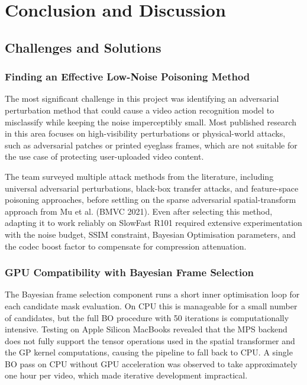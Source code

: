 \chapter{Conclusion and Discussion}
\label{chap:conclusion-discussion}

\section{Challenges and Solutions}
\label{section:challenges}

\subsection{Finding an Effective Low-Noise Poisoning Method}

The most significant challenge in this project was
identifying an adversarial perturbation method that
could cause a video action recognition model to
misclassify while keeping the noise imperceptibly small.
Most published research in this area focuses on
high-visibility perturbations or physical-world attacks,
such as adversarial patches or printed eyeglass frames,
which are not suitable for the use case of protecting
user-uploaded video content.

The team surveyed multiple attack methods from the
literature, including universal adversarial perturbations,
black-box transfer attacks, and feature-space poisoning
approaches, before settling on the sparse adversarial
spatial-transform approach from Mu et al. (BMVC 2021).
Even after selecting this method, adapting it to work
reliably on SlowFast R101 required extensive
experimentation with the noise budget, SSIM constraint,
Bayesian Optimisation parameters, and the codec boost
factor to compensate for compression attenuation.

\subsection{GPU Compatibility with Bayesian Frame Selection}

The Bayesian frame selection component runs a short
inner optimisation loop for each candidate mask
evaluation. On CPU this is manageable for a small
number of candidates, but the full BO procedure with
50 iterations is computationally intensive. Testing
on Apple Silicon MacBooks revealed that the MPS
backend does not fully support the tensor operations
used in the spatial transformer and the GP kernel
computations, causing the pipeline to fall back to
CPU. A single BO pass on CPU without GPU acceleration
was observed to take approximately one hour per video,
which made iterative development impractical.

